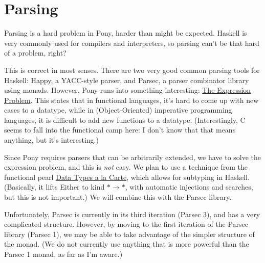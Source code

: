 \documentclass[11pt]{article}
\begin{document}
\section{Parsing}
\label{sec-6}


Parsing is a hard problem in Pony, harder than might be expected. Haskell is very commonly used for compilers and interpreters, so parsing can't be that hard of a problem, right?

This is correct in most senses. There are two very good common parsing tools for Haskell: Happy, a YACC-style parser, and Parsec, a parser combinator library using monads. However, Pony runs into something interesting: \href{http://homepages.inf.ed.ac.uk/wadler/papers/expression/expression.txt}{The Expression Problem}. This states that in functional languages, it's hard to come up with new cases to a datatype, while in (Object-Oriented) imperative programming languages, it is difficult to add new functions to a datatype. (Interestingly, C seems to fall into the functional camp here: I don't know that that means anything, but it's interesting.)

Since Pony requires parsers that can be arbitrarily extended, we have to solve the expression problem, and this is \emph{not} easy. We plan to use a technique from the functional pearl \href{http://journals.cambridge.org/action/displayAbstract?fromPage=online&aid=1899152}{Data Types a la Carte}, which allows for subtyping in Haskell. (Basically, it lifts Either to kind \(* \to *\), with automatic injections and searches, but this is not important.) We will combine this with the Parsec library. 

Unfortunately, Parsec is currently in its third iteration (Parsec 3), and has a very complicated structure. However, by moving to the first iteration of the Parsec library (Parsec 1), we may be able to take advantage of the simpler structure of the monad. (We do not currently use anything that is more powerful than the Parsec 1 monad, as far as I'm aware.)
\end{document}
